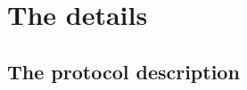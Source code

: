 


\section{The details}
\label{sec:4thProcDetails}

\subsection{The protocol description}
\label{sec:4thprocSteps}

